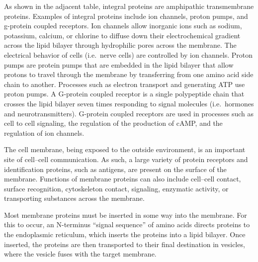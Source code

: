 \documentclass[
]{book}
\begin{document}
As shown in the adjacent table, integral proteins are amphipathic transmembrane proteins. Examples of integral proteins include ion channels, proton pumps, and g-protein coupled receptors. Ion channels allow inorganic ions such as sodium, potassium, calcium, or chlorine to diffuse down their electrochemical gradient across the lipid bilayer through hydrophilic pores across the membrane. The electrical behavior of cells (i.e.~nerve cells) are controlled by ion channels. Proton pumps are protein pumps that are embedded in the lipid bilayer that allow protons to travel through the membrane by transferring from one amino acid side chain to another. Processes such as electron transport and generating ATP use proton pumps. A G-protein coupled receptor is a single polypeptide chain that crosses the lipid bilayer seven times responding to signal molecules (i.e.~hormones and neurotransmitters). G-protein coupled receptors are used in processes such as cell to cell signaling, the regulation of the production of cAMP, and the regulation of ion channels.

The cell membrane, being exposed to the outside environment, is an important site of cell--cell communication. As such, a large variety of protein receptors and identification proteins, such as antigens, are present on the surface of the membrane. Functions of membrane proteins can also include cell--cell contact, surface recognition, cytoskeleton contact, signaling, enzymatic activity, or transporting substances across the membrane.

Most membrane proteins must be inserted in some way into the membrane. For this to occur, an N-terminus ``signal sequence'' of amino acids directs proteins to the endoplasmic reticulum, which inserts the proteins into a lipid bilayer. Once inserted, the proteins are then transported to their final destination in vesicles, where the vesicle fuses with the target membrane.
\end{document}
